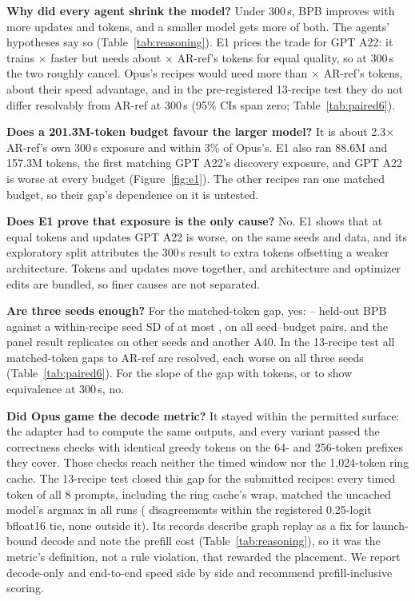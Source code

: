 \documentclass{article}
\begin{document}
\textbf{Why did every agent shrink the model?} Under 300\,s, BPB improves with more updates and tokens, and a smaller model gets more of both. The agents' hypotheses say so (Table~\ref{tab:reasoning}). E1 prices the trade for GPT A22: it trains \CREOneRho$\times$ faster but needs about \CREOneK$\times$ AR-ref's tokens for equal quality, so at 300\,s the two roughly cancel. Opus's recipes would need more than \CRMTKBound$\times$ AR-ref's tokens, about their speed advantage, and in the pre-registered 13-recipe test they do not differ resolvably from AR-ref at 300\,s (95\% CIs span zero; Table~\ref{tab:paired6}).

\textbf{Does a 201.3M-token budget favour the larger model?} It is about 2.3$\times$ AR-ref's own 300\,s exposure and within 3\% of Opus's. E1 also ran 88.6M and 157.3M tokens, the first matching GPT A22's discovery exposure, and GPT A22 is worse at every budget (Figure~\ref{fig:e1}). The other recipes ran one matched budget, so their gap's dependence on it is untested.

\textbf{Does E1 prove that exposure is the only cause?} No. E1 shows that at equal tokens and updates GPT A22 is worse, on the same seeds and data, and its exploratory split attributes the 300\,s result to extra tokens offsetting a weaker architecture. Tokens and updates move together, and architecture and optimizer edits are bundled, so finer causes are not separated.

\textbf{Are three seeds enough?} For the matched-token gap, yes: \CREOneMatchedLoAbs--\CREOneMatchedHiAbs{} held-out BPB against a within-recipe seed SD of at most \CREOneMaxSD, on all \CREOnePairs{} seed--budget pairs, and the panel result replicates on other seeds and another A40. In the 13-recipe test all \CRSixTokWorseCount{} matched-token gaps to AR-ref are resolved, each worse on all three seeds (Table~\ref{tab:paired6}). For the slope of the gap with tokens, or to show equivalence at 300\,s, no.

\textbf{Did Opus game the decode metric?} It stayed within the permitted surface: the adapter had to compute the same outputs, and every variant passed the correctness checks with identical greedy tokens on the 64- and 256-token prefixes they cover. Those checks reach neither the timed window nor the 1{,}024-token ring cache. The 13-recipe test closed this gap for the submitted recipes: every timed token of all 8 prompts, including the ring cache's wrap, matched the uncached model's argmax in all \CRSixCorrectRuns{} runs (\CRSixNearTies{} disagreements within the registered 0.25-logit bfloat16 tie, none outside it). Its records describe graph replay as a fix for launch-bound decode and note the prefill cost (Table~\ref{tab:reasoning}), so it was the metric's definition, not a rule violation, that rewarded the placement. We report decode-only and end-to-end speed side by side and recommend prefill-inclusive scoring.
\end{document}
